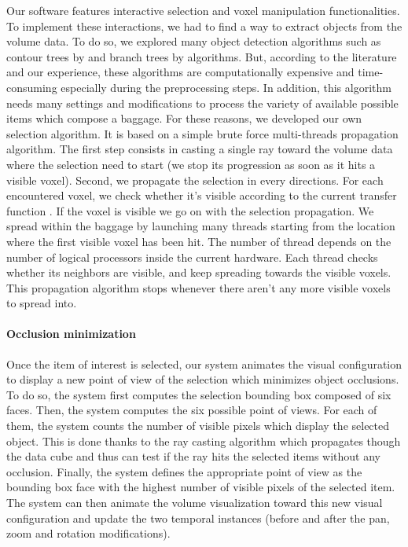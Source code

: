 Our software features interactive selection and voxel manipulation functionalities. To implement these interactions, we had to find a way to extract objects from the volume data. To do so, we explored many object detection algorithms such as contour trees by \cite{carr_computing_2000} and branch trees by \cite{pascucci_multi-resolution_2004} algorithms. But, according to the literature and our experience, these algorithms are computationally expensive and time-consuming especially during the preprocessing steps. In addition, this algorithm needs many settings and modifications to process the variety of available possible items which compose a baggage. For these reasons, we developed our own selection algorithm. It is based on a simple brute force multi-threads propagation algorithm. The first step consists in casting a single ray toward the volume data where the selection need to start (we stop its progression as soon as it hits a visible voxel). Second, we propagate the selection in every directions. For each encountered voxel, we check whether it’s visible according to the current transfer function . If the voxel is visible we go on with the selection propagation. We spread within the baggage by launching many threads starting from the location where the first visible voxel has been hit. The number of thread depends on the number of logical processors inside the current hardware. Each thread checks whether its neighbors are visible, and keep spreading towards the visible voxels. This propagation algorithm stops whenever there aren’t any more visible voxels to spread into.


\paragraph{Occlusion minimization}

Once the item of interest is selected, our system animates the visual configuration to display a new point of view of the selection which minimizes object occlusions. To do so, the system first computes the selection bounding box composed of six faces. Then, the system computes the six possible point of views. For each of them, the system counts the number of visible pixels which display the selected object. This is done thanks to the ray casting algorithm which propagates though the data cube and thus can test if the ray hits the selected items without any occlusion. Finally, the system defines the appropriate point of view as the bounding box face with the highest number of visible pixels of the selected item.
The system can then animate the volume visualization toward this new visual configuration and update the two temporal instances (before and after the pan, zoom and rotation modifications).

